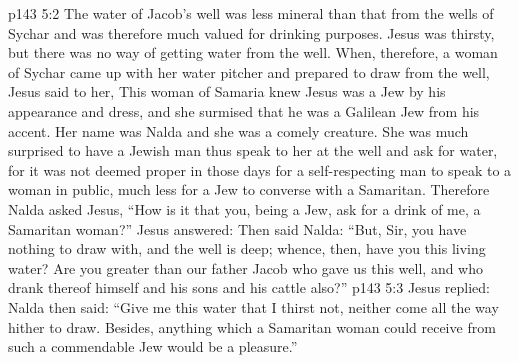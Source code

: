 \vs p143 5:2 The water of Jacob’s well was less mineral than that from the wells of Sychar and was therefore much valued for drinking purposes. Jesus was thirsty, but there was no way of getting water from the well. When, therefore, a woman of Sychar came up with her water pitcher and prepared to draw from the well, Jesus said to her,  This woman of Samaria knew Jesus was a Jew by his appearance and dress, and she surmised that he was a Galilean Jew from his accent. Her name was Nalda and she was a comely creature. She was much surprised to have a Jewish man thus speak to her at the well and ask for water, for it was not deemed proper in those days for a self\hyp{}respecting man to speak to a woman in public, much less for a Jew to converse with a Samaritan. Therefore Nalda asked Jesus, “How is it that you, being a Jew, ask for a drink of me, a Samaritan woman?” Jesus answered:  Then said Nalda: “But, Sir, you have nothing to draw with, and the well is deep; whence, then, have you this living water? Are you greater than our father Jacob who gave us this well, and who drank thereof himself and his sons and his cattle also?”
\vs p143 5:3 Jesus replied:  Nalda then said: “Give me this water that I thirst not, neither come all the way hither to draw. Besides, anything which a Samaritan woman could receive from such a commendable Jew would be a pleasure.”
